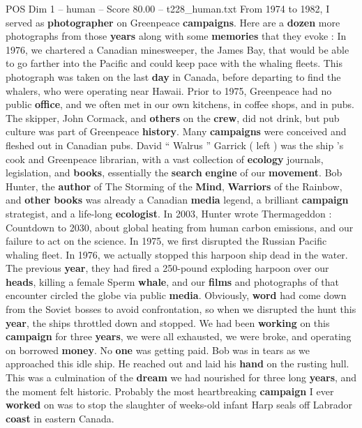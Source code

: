 \begin{textsample}{POS Dim 1 – human – Score 80.00 – t228\_human.txt}  \label{ex:f1_pos_015}
From 1974 to 1982, I served as \textbf{photographer} on Greenpeace \textbf{campaigns}.
Here are a \textbf{dozen} more photographs from those \textbf{years} along with some \textbf{memories} that they evoke : In 1976, we chartered a Canadian minesweeper, the James Bay, that would be able to go farther into the Pacific and could keep pace with the whaling fleets.
This photograph was taken on the last \textbf{day} in Canada, before departing to find the whalers, who were operating near Hawaii.
Prior to 1975, Greenpeace had no public \textbf{office}, and we often met in our own kitchens, in coffee shops, and in pubs.
The skipper, John Cormack, and \textbf{others} on the \textbf{crew}, did not drink, but pub culture was part of Greenpeace \textbf{history}.
Many \textbf{campaigns} were conceived and fleshed out in Canadian pubs.
David “ Walrus ” Garrick ( left ) was the ship ’s cook and Greenpeace librarian, with a vast collection of \textbf{ecology} journals, legislation, and \textbf{books}, essentially the \textbf{search} \textbf{engine} of our \textbf{movement}.
Bob Hunter, the \textbf{author} of The Storming of the \textbf{Mind}, \textbf{Warriors} of the Rainbow, and \textbf{other} \textbf{books} was already a Canadian \textbf{media} legend, a brilliant \textbf{campaign} strategist, and a life-long \textbf{ecologist}.
In 2003, Hunter wrote Thermageddon : Countdown to 2030, about global heating from human carbon emissions, and our failure to act on the science.
In 1975, we first disrupted the Russian Pacific whaling fleet.
In 1976, we actually stopped this harpoon ship dead in the water.
The previous \textbf{year}, they had fired a 250-pound exploding harpoon over our \textbf{heads}, killing a female Sperm \textbf{whale}, and our \textbf{films} and photographs of that encounter circled the globe via public \textbf{media}.
Obviously, \textbf{word} had come down from the Soviet bosses to avoid confrontation, so when we disrupted the hunt this \textbf{year}, the ships throttled down and stopped.
We had been \textbf{working} on this \textbf{campaign} for three \textbf{years}, we were all exhausted, we were broke, and operating on borrowed \textbf{money}.
No \textbf{one} was getting paid.
Bob was in tears as we approached this idle ship.
He reached out and laid his \textbf{hand} on the rusting hull.
This was a culmination of the \textbf{dream} we had nourished for three long \textbf{years}, and the moment felt historic.
Probably the most heartbreaking \textbf{campaign} I ever \textbf{worked} on was to stop the slaughter of weeks-old infant Harp seals off Labrador \textbf{coast} in eastern Canada.

\end{textsample}
